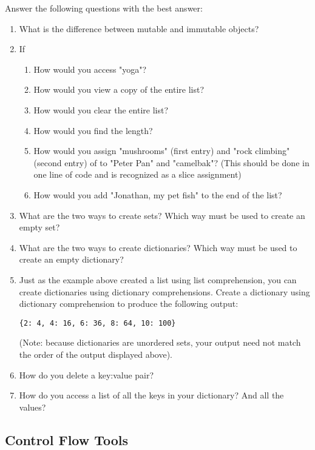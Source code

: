 \begin{problem}
Answer the following questions with the best answer:
\begin{enumerate}
\item What is the difference between mutable and immutable objects?
\item If 
\begin{enumerate}
	\item How would you access "yoga"? 
	\item How would you view a copy of the entire list?
	\item How would you clear the entire list? 
	\item How would you find the length? 
	\item How would you assign "mushrooms" (first entry) and "rock climbing" (second entry) 
	of  to "Peter Pan" and "camelbak"? 
	(This should be done in one line of code and is recognized as a slice assignment)
	\item How would you add "Jonathan, my pet fish" to the end of the list?
\end{enumerate}
\item What are the two ways to create sets? Which way must be used to 
create an empty set?
\item What are the two ways to create dictionaries? Which way must be used to
create an empty dictionary?
\item Just as the example above created a list using list comprehension, you can create dictionaries using dictionary comprehensions.
Create a dictionary using dictionary comprehension to produce the following output:
\begin{lstlisting}
{2: 4, 4: 16, 6: 36, 8: 64, 10: 100}
\end{lstlisting}
(Note: because dictionaries are unordered sets, your output need not match the order of the output displayed above).
\item How do you delete a key:value pair?
\item How do you access a list of all the keys in your dictionary? And all the values?


\end{enumerate}
\end{problem}


\subsection*{Control Flow Tools}

